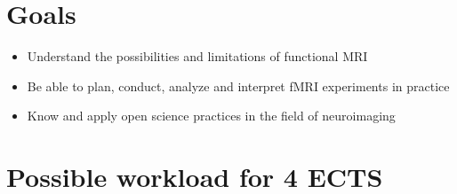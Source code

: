 \documentclass[
  letterpaper,
]{report}
\begin{document}
\section*{Goals}\label{goals}


\begin{itemize}
\item
  Understand the possibilities and limitations of functional MRI
\item
  Be able to plan, conduct, analyze and interpret fMRI experiments in
  practice
\item
  Know and apply open science practices in the field of neuroimaging
\end{itemize}

\section*{Possible workload for 4
ECTS}\label{possible-workload-for-4-ects}

\end{document}
